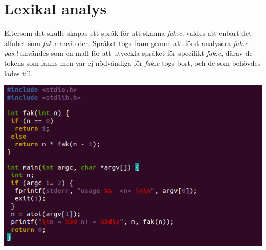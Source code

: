 \section{Lexikal analys}

Eftersom det skulle skapas ett språk för att skanna \textit{fak.c}, valdes att enbart det alfabet
som \textit{fak.c} använder. Språket togs fram genom att först analysera \textit{fak.c}.
\\ \textit{pas.l} användes som en mall för att utveckla språket för specifikt \textit{fak.c},
därav de tokens som fanns men var ej nödvändiga för \textit{fak.c} togs bort, och de som
behövdes lades till. 

\begin{center}
    \includegraphics[width=\linewidth]{bilder/fak_c.png}
    \label{fig:fak_c}
\end{center}

\newpage


